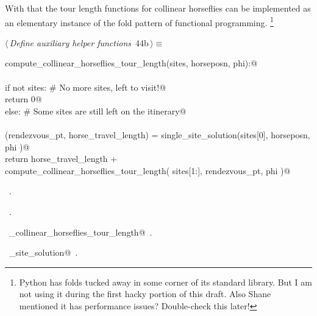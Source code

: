 \documentclass[11.5pt]{report}
\begin{document}
\vspace{-0.8cm}
With that the tour length functions for collinear horseflies can be implemented as 
an elementary instance of the fold pattern of functional programming. 
\footnote{Python has folds tucked away in some corner of its standard library. 
But I am not using it during the first hacky portion of this draft. Also Shane 
mentioned it has performance issues? Double-check this later!}


\begin{flushleft} \small\label{scrap66}\raggedright\small
{} $\langle\,${\itshape Define auxiliary helper functions}\nobreak\ {\footnotesize {44b}}$\,\rangle\equiv$
\vspace{-1ex}
\begin{list}{}{} \item
\mbox{}\verb@def compute_collinear_horseflies_tour_length(sites, horseposn, phi):@\\
\mbox{}\verb@@\\
\mbox{}\verb@     if not sites: # No more sites, left to visit!@\\
\mbox{}\verb@          return 0@\\
\mbox{}\verb@     else:         # Some sites are still left on the itinerary@\\
\mbox{}\verb@@\\
\mbox{}\verb@          (rendezvous_pt, horse_travel_length) = single_site_solution(sites[0], horseposn, phi )@\\
\mbox{}\verb@          return horse_travel_length  + \@\\
\mbox{}\verb@                 compute_collinear_horseflies_tour_length( sites[1:], rendezvous_pt, phi )@\\
\mbox{}\verb@@{\NWsep}
\end{list}
\vspace{-1.5ex}
\footnotesize
\begin{list}{}{\setlength{\itemsep}{-\parsep}\setlength{\itemindent}{-\leftmargin}}
\item \NWtxtMacroDefBy\ .
\item \NWtxtMacroRefIn\ .
\item \NWtxtIdentsDefed\nobreak\  \verb@compute_collinear_horseflies_tour_length@\nobreak\ .\item \NWtxtIdentsUsed\nobreak\  \verb@single_site_solution@\nobreak\ .
\item{}
\end{list}
\vspace{4ex}
\end{flushleft}
\end{document}
